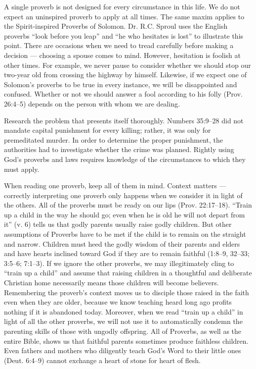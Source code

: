 A single proverb is not designed for every circumstance in this life. We do not expect an uninspired proverb to apply at all times. The same maxim applies to the Spirit-inspired Proverbs of Solomon. Dr. R.C. Sproul uses the English proverbs “look before you leap” and “he who hesitates is lost” to illustrate this point. There are occasions when we need to tread carefully before making a decision — choosing a spouse comes to mind. However, hesitation is foolish at other times. For example, we never pause to consider whether we should stop our two-year old from crossing the highway by himself. Likewise, if we expect one of Solomon’s proverbs to be true in every instance, we will be disappointed and confused. Whether or not we should answer a fool according to his folly (Prov. 26:4–5) depends on the person with whom we are dealing. 

Research the problem that presents itself thoroughly. Numbers 35:9–28 did not mandate capital punishment for every killing; rather, it was only for premeditated murder. In order to determine the proper punishment, the authorities had to investigate whether the crime was planned. Rightly using God’s proverbs and laws requires knowledge of the circumstances to which they must apply.

When reading one proverb, keep all of them in mind. Context matters — correctly interpreting one proverb only happens when we consider it in light of the others. All of the proverbs must be ready on our lips (Prov. 22:17–18). “Train up a child in the way he should go; even when he is old he will not depart from it” (v. 6) tells us that godly parents usually raise godly children. But other assumptions of Proverbs have to be met if the child is to remain on the straight and narrow. Children must heed the godly wisdom of their parents and elders and have hearts inclined toward God if they are to remain faithful (1:8–9, 32–33; 3:5–6; 7:1–3). If we ignore the other proverbs, we may illegitimately cling to “train up a child” and assume that raising children in a thoughtful and deliberate Christian home necessarily means those children will become believers. Remembering the proverb’s context moves us to disciple those raised in the faith even when they are older, because we know teaching heard long ago profits nothing if it is abandoned today. Moreover, when we read “train up a child” in light of all the other proverbs, we will not use it to automatically condemn the parenting skills of those with ungodly offspring. All of Proverbs, as well as the entire Bible, shows us that faithful parents sometimes produce faithless children. Even fathers and mothers who diligently teach God’s Word to their little ones (Deut. 6:4–9) cannot exchange a heart of stone for heart of flesh.

